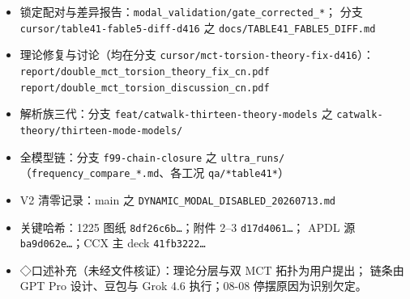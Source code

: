 \documentclass[11pt,a4paper]{ctexart}
\begin{document}
\begin{itemize}
  \item 锁定配对与差异报告：\texttt{modal\_validation/gate\_corrected\_*}；
        \newline 分支 \texttt{cursor/table41-fable5-diff-d416} 之
        \newline \texttt{docs/TABLE41\_FABLE5\_DIFF.md}
  \item 理论修复与讨论（均在分支 \texttt{cursor/mct-torsion-theory-fix-d416}）：
        \newline \texttt{report/double\_mct\_torsion\_theory\_fix\_cn.pdf}
        \newline \texttt{report/double\_mct\_torsion\_discussion\_cn.pdf}
  \item 解析族三代：分支 \texttt{feat/catwalk-thirteen-theory-models} 之
        \newline\texttt{catwalk-theory/thirteen-mode-models/}
  \item 全模型链：分支 \texttt{f99-chain-closure} 之 \texttt{ultra\_runs/}
        （\texttt{frequency\_compare\_*.md}、各工况 \texttt{qa/*table41*}）
  \item V2 清零记录：main 之 \texttt{DYNAMIC\_MODAL\_DISABLED\_20260713.md}
  \item 关键哈希：1225 图纸 \texttt{8df26c6b\ldots}；附件 2--3 \texttt{d17d4061\ldots}；
        APDL 源 \texttt{ba9d062e\ldots}；CCX 主 deck \texttt{41fb3222\ldots}
  \item ◇口述补充（未经文件核证）：理论分层与双 MCT 拓扑为用户提出；
        链条由 GPT Pro 设计、豆包与 Grok 4.6 执行；08-08 停摆原因为识别欠定。
\end{itemize}
\end{document}
